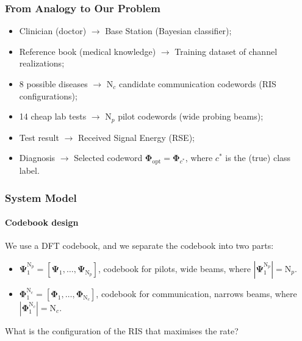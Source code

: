 \documentclass[11pt,aspectratio=1610]{beamer}
\begin{document}
    \begin{frame}
        \frametitle{From Analogy to Our Problem}
        \begin{itemize}[<+-|alert@+>]
            \item Clinician (doctor) $\longrightarrow$ Base Station (Bayesian classifier);
            \item Reference book (medical knowledge) $\longrightarrow$ Training dataset of channel realizations;
            \item 8 possible diseases $\longrightarrow$ $\mathrm N_c$ candidate communication codewords (RIS configurations);
            \item 14 cheap lab tests $\longrightarrow$ $\mathrm N_p$ pilot codewords (wide probing beams);
            \item Test result $\longrightarrow$ Received Signal Energy (RSE);
            \item Diagnosis $\longrightarrow$ Selected codeword $\boldsymbol{\Phi}_{\text{opt}} = \boldsymbol{\Phi}_{c^*}$, where $c^*$ is the (true) class label.
        \end{itemize}
        \vspace{0.4cm}
    \end{frame}


    \begin{frame}
        \frametitle{System Model}
        \framesubtitle{Codebook design}
        We use a DFT codebook, and we separate the codebook into two parts: 
        \begin{itemize}
            \item {} $\boldsymbol{\Psi}_{1}^{\mathrm N_p} = [\boldsymbol{\Psi}_1,\ldots,\boldsymbol{\Psi}_{\mathrm N_p}]$, codebook for pilots, wide beams, where $|\boldsymbol{\Psi}_{1}^{\mathrm N_p}| = \mathrm N_p$.
            \item {} $\boldsymbol{\Phi}_{1}^{\mathrm N_c} = [\boldsymbol{\Phi}_1,\ldots,\boldsymbol{\Phi}_{\mathrm N_c}]$, codebook for communication, narrows beams, where $|\boldsymbol{\Phi}_{1}^{\mathrm N_c}| = \mathrm N_c$.
        \end{itemize}
        \vspace{5mm}
         What is the configuration of the RIS that maximises the rate?
    \end{frame}
    
\end{document}
